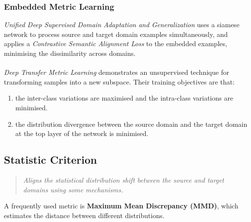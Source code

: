 \documentclass{report}
\newcommand{\quoteit}[1]{\begin{quote}\textit{#1}\end{quote}}
\begin{document}
\subsubsection{Embedded Metric Learning}
\textit{Unified Deep Supervised Domain Adaptation and Generalization}\parencite{unifieddeepadaptation} uses a siamese network to process source and target domain examples simultaneously, and applies a \textit{Contrastive Semantic Alignment Loss} to the embedded examples, minimising the dissimilarity across domains. \\ \\
\textit{Deep Transfer Metric Learning}\parencite{deeptransfermetric} demonstrates an unsupervised technique for transforming samples into a new subspace. Their training objectives are that:
\begin{enumerate}
	\item the inter-class variations are maximised and the intra-class variations are minimised.
	\item the distribution divergence between the source domain and the target domain at the top layer of the network is minimised.
\end{enumerate}




\subsection{Statistic Criterion}
\quoteit{Aligns the statistical distribution shift between the source and target domains using some mechanisms.}
A frequently used metric is \textbf{Maximum Mean Discrepancy (MMD)}, which estimates the distance between different distributions. 
\end{document}
